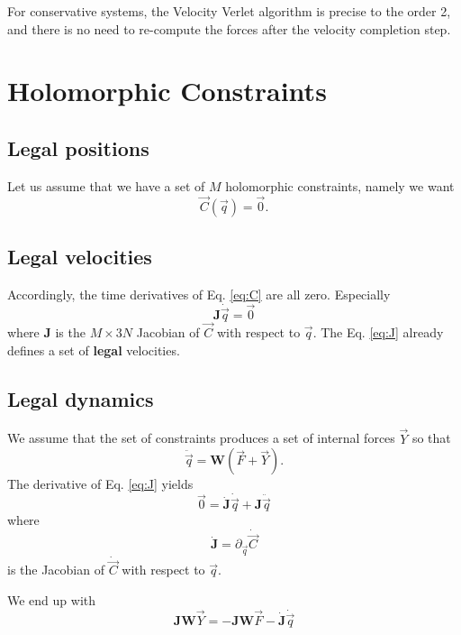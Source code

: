 \documentclass[aps,twocolumn]{revtex4}
\newcommand{\mymat}[1]{\boldsymbol{#1}}
\begin{document}
For conservative systems, the Velocity Verlet algorithm is precise to the order 2, and there is
no need to re-compute the forces after the velocity completion step.

\section{Holomorphic Constraints}
\subsection{Legal positions}

Let us assume that we have a set of $M$ holomorphic constraints, namely we want
\begin{equation}
	\label{eq:C}
	\vec{C}\left(\vec{q}\right) = \vec{0}.
\end{equation}

\subsection{Legal velocities}
Accordingly, the time derivatives of Eq. \eqref{eq:C} are all zero.
Especially
\begin{equation}
	\label{eq:J}
	\mymat{J}\dot{\vec{q}} = \vec{0}
\end{equation}
where $\mymat{J}$ is the $M\times 3N$ Jacobian of $\vec{C}$ with respect to $\vec{q}$.
The Eq. \eqref{eq:J} already defines a set of \textbf{legal} velocities.

\subsection{Legal dynamics}
We assume that the set of constraints produces a set of internal forces $\vec{Y}$ so that
\begin{equation}
	\ddot{\vec{q}} = \mymat{W} \left( \vec{F} + \vec{Y} \right).
\end{equation}
The derivative of Eq. \eqref{eq:J} yields
\begin{equation}
	\vec{0} = \dot{\mymat{J}}\dot{\vec{q}} + \mymat{J}\ddot{\vec{q}}
\end{equation}
where
\begin{equation}
	\dot{\mymat{J}} = \partial_{\vec{q}} \dot{\vec{C}}
\end{equation}
is the Jacobian of $\dot{\vec{C}}$ with respect to $\vec{q}$.

We end up with
\begin{equation}
\label{eq:JW}
	\mymat{J}\mymat{W}\vec{Y} = 
	-\mymat{J}\mymat{W}\vec{F} - \dot{\mymat{J}}\dot{\vec{q}}
\end{equation}
\end{document}
